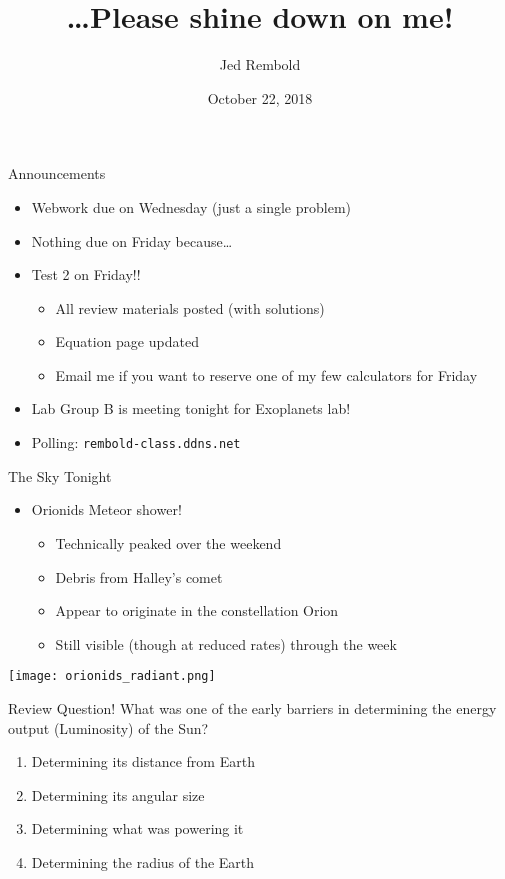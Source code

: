 \documentclass[pdf, aspectratio=169]{beamer}
\title{\ldots Please shine down on me!}
\author{Jed Rembold}
\date{October 22, 2018}
\begin{document}
\renewcommand{\theenumi}{\Alph{enumi}}

\begin{frame}{Announcements}
	\begin{itemize}
		\item Webwork due on Wednesday (just a single problem)
		\item Nothing due on Friday because\ldots
		\item Test 2 on Friday!!
			\begin{itemize}
				\item All review materials posted (with solutions)
				\item Equation page updated
				\item Email me if you want to reserve one of my few calculators for Friday
			\end{itemize}
		\item Lab Group B is meeting tonight for Exoplanets lab!
		\item Polling: \nolinkurl{rembold-class.ddns.net}
	\end{itemize}
\end{frame}

\begin{frame}{The Sky Tonight}
	\begin{itemize}
		\item Orionids Meteor shower!
			\begin{itemize}
				\item Technically peaked over the weekend
				\item Debris from Halley's comet
				\item Appear to originate in the constellation Orion
				\item Still visible (though at reduced rates) through the week
			\end{itemize}
	\end{itemize}
	\begin{center}
		\texttt{[image: orionids\_radiant.png]}
	\end{center}
\end{frame}

\begin{frame}{Review Question!}
  What was one of the early barriers in determining the energy output (Luminosity) of the Sun?
  \begin{enumerate}
	\item \alert<2>{Determining its distance from Earth}
	\item Determining its angular size
	\item Determining what was powering it
	\item Determining the radius of the Earth
  \end{enumerate}
\end{frame}
\end{document}
